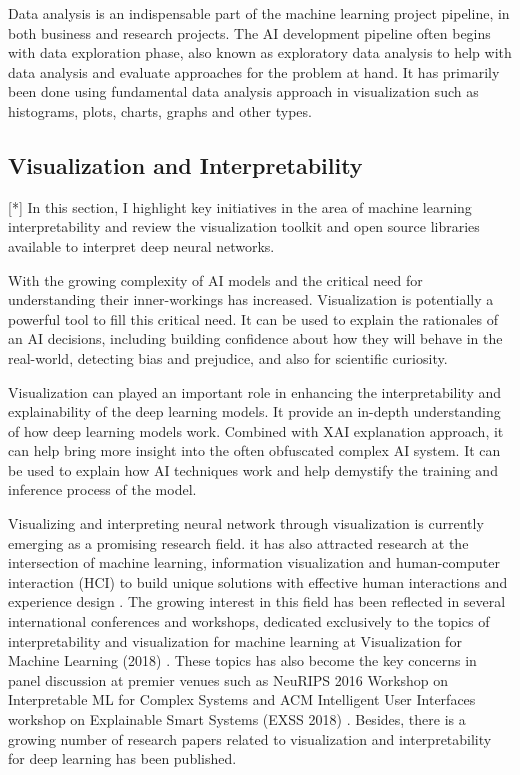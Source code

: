 Data analysis is an indispensable part of the machine learning project pipeline, in both business and research projects. The AI development pipeline often begins with data exploration phase, also known as exploratory data analysis to help with data analysis and evaluate approaches for the problem at hand. It has primarily been done using fundamental data analysis approach in visualization such as histograms, plots, charts, graphs and other types.

\subsection{Visualization and Interpretability}

[*] In this section, I highlight key initiatives in the area of machine learning interpretability and review the visualization toolkit and open source libraries available to interpret deep neural networks.

With the growing complexity of AI models and the critical need for understanding their inner-workings has increased. Visualization is potentially a powerful tool to fill this critical need. It can be used to explain the rationales of an AI decisions, including building confidence about how they will behave in the real-world, detecting bias and prejudice, and also for scientific curiosity.

Visualization can played an important role in enhancing the interpretability and explainability of the deep learning models. It provide an in-depth understanding of how deep learning models work. Combined with XAI explanation approach, it can help bring more insight into the often obfuscated complex AI system. It can be used to explain how AI techniques work and help demystify the training and inference process of the model.

Visualizing and interpreting neural network through visualization is currently emerging as a promising research field. it has also attracted research at the intersection of machine learning, information visualization and human-computer interaction (HCI) to build unique solutions with effective human interactions and experience design \cite{Dudley2018}. The growing interest in this field has been reflected in several international conferences and workshops, dedicated exclusively to the topics of interpretability and visualization for machine learning at Visualization for Machine Learning (2018) \cite{visml2018}. These topics has also become the key concerns in panel discussion at premier venues such as NeuRIPS 2016 Workshop on Interpretable ML for Complex Systems \cite{imlcs2016}and ACM Intelligent User Interfaces workshop on Explainable Smart Systems (EXSS 2018) \cite{exss2018}. Besides, there is a growing number of research papers related to visualization and interpretability for deep learning has been published.

